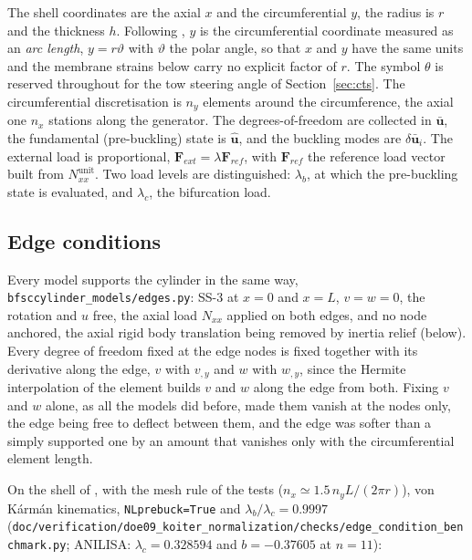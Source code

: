 \documentclass[11pt,a4paper]{article}
\begin{document}
The shell coordinates are the axial $x$ and the circumferential $y$, the
radius is $r$ and the thickness $h$.  Following \citet{dossantos2022}, $y$
is the circumferential coordinate measured as an \emph{arc length},
$y = r\vartheta$ with $\vartheta$ the polar angle, so that $x$ and $y$
have the same units and the membrane strains below carry no explicit
factor of $r$.  The symbol $\theta$ is reserved throughout for the tow
steering angle of Section~\ref{sec:cts}.  The circumferential
discretisation is $n_y$ elements around the circumference, the axial one
$n_x$ stations along the generator.  The degrees-of-freedom are collected in
$\boldsymbol{\bar{u}}$, the fundamental (pre-buckling) state is
$\boldsymbol{\hat{u}}$, and the buckling modes are $\delta\boldsymbol{\bar{u}}_i$.
The external load is proportional, $\boldsymbol{F}_{ext} = \lambda
\boldsymbol{F}_{ref}$, with $\boldsymbol{F}_{ref}$ the reference load vector
built from $N_{xx}^{\text{unit}}$.  Two load levels are distinguished:
$\lambda_b$, at which the pre-buckling state is evaluated, and $\lambda_c$,
the bifurcation load.

\subsection{Edge conditions}
\label{sec:edges}

Every model supports the cylinder in the same way,
\texttt{bfsccylinder\_models/edges.py}: SS-3 at $x = 0$ and $x = L$, $v = w =
0$, the rotation and $u$ free, the axial load $N_{xx}$ applied on both edges,
and no node anchored, the axial rigid body translation being removed by
inertia relief (below).  Every degree of freedom fixed at the edge nodes is fixed
together with its derivative along the edge, $v$ with $v_{,y}$ and $w$ with
$w_{,y}$, since the Hermite interpolation of the element builds $v$ and $w$
along the edge from both.  Fixing $v$ and $w$ alone, as all the models did
before, made them vanish at the nodes only, the edge being free to deflect
between them, and the edge was softer than a simply supported one by an
amount that vanishes only with the circumferential element length.

On the shell of \citet{arbocz2001}, with the mesh rule of the tests
($n_x \simeq 1.5\,n_y L/(2\pi r)$), von K\'arm\'an kinematics,
\texttt{NLprebuck=True} and $\lambda_b/\lambda_c = 0.9997$
(\texttt{doc/verification/doe09\_koiter\_normalization/checks/edge\_condition\_benchmark.py};
ANILISA: $\lambda_c = 0.328594$ and $b = -0.37605$ at $n = 11$):
\end{document}
